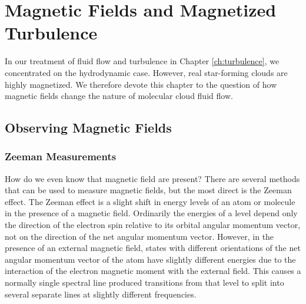\chapter{Magnetic Fields and Magnetized Turbulence}
\label{ch:magnetic}


In our treatment of fluid flow and turbulence in Chapter \ref{ch:turbulence}, we concentrated on the hydrodynamic case. However, real star-forming clouds are highly magnetized. We therefore devote this chapter to the question of how magnetic fields change the nature of molecular cloud fluid flow.

\section{Observing Magnetic Fields}

\subsection{Zeeman Measurements}

How do we even know that magnetic field are present? There are several methods that can be used to measure magnetic fields, but the most direct is the Zeeman effect. The Zeeman effect is a slight shift in energy levels of an atom or molecule in the presence of a magnetic field. Ordinarily the energies of a level depend only the direction of the electron spin relative to its orbital angular momentum vector, not on the direction of the net angular momentum vector. However, in the presence of an external magnetic field, states with different orientations of the net angular momentum vector of the atom have slightly different energies due to the interaction of the electron magnetic moment with the external field. This causes a normally single spectral line produced transitions from that level to split into several separate lines at slightly different frequencies.

